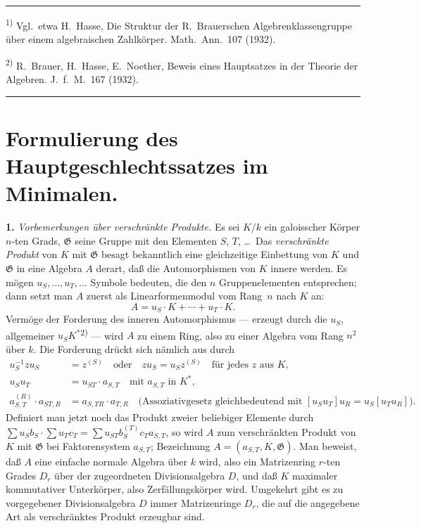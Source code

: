 \documentclass[12pt,a4paper]{article}
\theoremstyle{plain}
\newcommand{\Ga}{\mathfrak{G}}
\begin{document}
\bigskip
\noindent\rule{0.3\textwidth}{0.4pt}

{\small
\textsuperscript{1)} Vgl.\ etwa H.~Hasse, Die Struktur der R.~Brauerschen Algebrenklassengruppe \"uber einem
algebraischen Zahlk\"orper. Math.\ Ann.\ 107 (1932).

\textsuperscript{2)} R.~Brauer, H.~Hasse, E.~Noether, Beweis eines Hauptsatzes in der Theorie der
Algebren. J.\ f.\ M.\ 167 (1932).
}

\vspace{0.5cm}
\noindent\rule{\textwidth}{0.4pt}
\vspace{0.5cm}

\section{Formulierung des Hauptgeschlechtssatzes im Minimalen.}
\label{sec:formulierung}

\medskip
\noindent\textbf{1.}\hspace{0.5em}%
\emph{Vorbemerkungen \"uber verschr\"ankte Produkte.}\hspace{0.5em}%
Es sei $K/k$ ein galoisscher K\"orper $n$-ten Grads, $\Ga$ seine Gruppe mit den
Elementen $S$, $T$, \ldots\ Das \emph{verschr\"ankte Produkt} von $K$ mit $\Ga$
besagt bekanntlich eine gleichzeitige Einbettung von $K$ und $\Ga$ in eine
Algebra $A$ derart, da\ss{} die Automorphismen von $K$ innere werden. Es
m\"ogen $u_S, \ldots, u_T, \ldots$ Symbole bedeuten, die den $n$ Gruppenelementen
entsprechen; dann setzt man $A$ zuerst als Linearformenmodul vom Rang~$n$
nach $K$ an:
\begin{equation}\label{eq:hp1}
A = u_S \cdot K + \cdots + u_T \cdot K.
\end{equation}
Verm\"oge der Forderung des inneren Automorphismus --- erzeugt durch
die $u_S$, allgemeiner $u_S K^*$\textsuperscript{2)} --- wird $A$ zu einem Ring, also zu einer Algebra
vom Rang $n^2$ \"uber $k$. Die Forderung dr\"uckt sich n\"amlich aus durch
\begin{align}
u_S^{-1} z u_S &= z^{(S)} \quad \text{oder} \quad z u_S = u_S z^{(S)}
\quad \text{f\"ur jedes $z$ aus $K$,} \label{eq:hp2} \\
u_S u_T &= u_{ST} \cdot a_{S,T} \quad \text{mit $a_{S,T}$ in $K^*$,} \label{eq:hp3} \\
a_{S,T}^{(R)} \cdot a_{ST,R} &= a_{S,TR} \cdot a_{T,R}
\quad \text{(Assoziativgesetz gleichbedeutend mit $[u_S u_T] u_R = u_S [u_T u_R]$).} \label{eq:hp4}
\end{align}
Definiert man jetzt noch das Produkt zweier beliebiger Elemente
durch $\sum u_S b_S \cdot \sum u_T c_T = \sum u_{ST} b_S^{(T)} c_T a_{S,T}$, so wird $A$ zum verschr\"ankten
Produkt von $K$ mit $\Ga$ bei Faktorensystem $a_{S,T}$; Bezeichnung $A = (a_{S,T}, K, \Ga)$.
Man beweist, da\ss{} $A$ eine einfache normale Algebra \"uber $k$ wird, also ein
Matrizenring $r$-ten Grades $D_r$ \"uber der zugeordneten Divisionsalgebra $D$,
und da\ss{} $K$ maximaler kommutativer Unterk\"orper, also Zerf\"allungsk\"orper
wird. Umgekehrt gibt es zu vorgegebener Divisionsalgebra $D$ immer
Matrizenringe $D_r$, die auf die angegebene Art als verschr\"anktes Produkt
erzeugbar sind.
\end{document}
